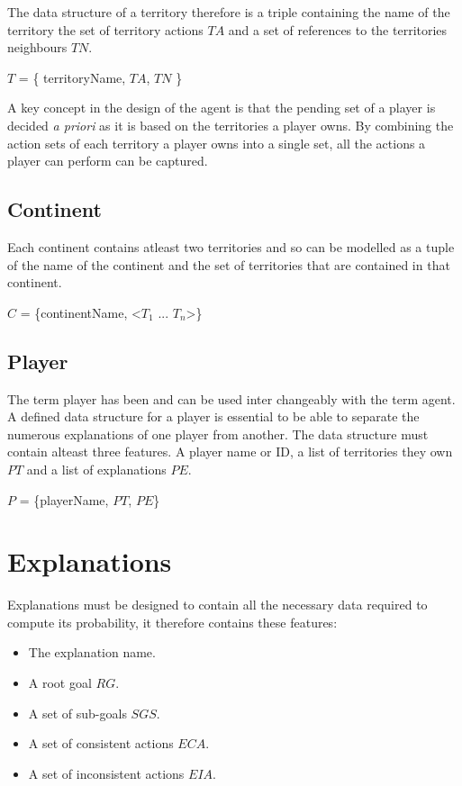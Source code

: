 \documentclass[parskip]{cs4rep}
\begin{document}
\newpage

The data structure of a territory therefore is a triple containing the name of the territory the set of territory actions  $TA$ and a set of references to the territories neighbours $TN$.

\centerline{
$T$ = \{ territoryName, $TA$, $TN$ \} 
}

A key concept in the design of the agent is that the pending set of a player is decided \textit{a priori} as it is based on the territories a player owns. By combining the action sets of each territory a player owns into a single set, all the actions a player can perform can be captured.

\subsection{Continent}

Each continent contains atleast two territories and so can be modelled as a tuple of the name of the continent and the set of territories that are contained in that continent.

\centerline{
$C$ = \{continentName, <$T_{1}$ ... $T_{n}$>\}
}

\subsection{Player}

The term player has been and can be used inter changeably with the term agent. A defined data structure for a player is essential to be able to separate the numerous explanations of one player from another. The data structure must contain alteast three features. A player name or ID, a list of territories they own $PT$ and a list of explanations $PE$.\newline

\centerline{
$P$ = \{playerName, $PT$, $PE$\}
}

\section{Explanations}

Explanations must be designed to contain all the necessary data required to compute its probability, it therefore contains these features:

\begin{itemize}
\item
The explanation name.
\item
A root goal $RG$.
\item
A set of sub-goals $SGS$.
\item
A set of consistent actions $ECA$.
\item
A set of inconsistent actions $EIA$.
\end{itemize}
\end{document}
